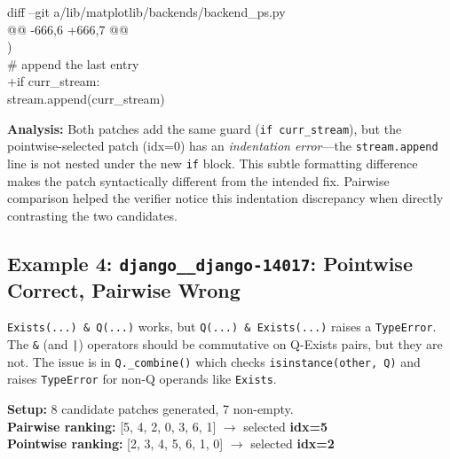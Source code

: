 \begin{tcolorbox}[
    colback=red!5,
    colframe=red!60!black,
    title={\textbf{Pointwise-Selected Patch (idx=0): Does not resolve the issue \ding{55}}},
    coltitle=white,
    fonttitle=\small\bfseries,
    breakable,
    enhanced
]
\small\ttfamily
diff --git a/lib/matplotlib/backends/backend\_ps.py\\
@@ -666,6 +666,7 @@\\
\quad\quad\quad\quad )\\
\quad\quad\quad \# append the last entry\\
+\quad\quad\quad if curr\_stream:\\
\quad\quad\quad stream.append(curr\_stream)
\end{tcolorbox}

\noindent\textbf{Analysis:} Both patches add the same guard (\texttt{if curr\_stream}), but the pointwise-selected patch (idx=0) has an \emph{indentation error}---the \texttt{stream.append} line is not nested under the new \texttt{if} block. This subtle formatting difference makes the patch syntactically different from the intended fix. Pairwise comparison helped the verifier notice this indentation discrepancy when directly contrasting the two candidates.


\subsection{Example 4: \texttt{django\_\_django-14017}: Pointwise Correct, Pairwise Wrong}

\begin{tcolorbox}[
    colback=promptbg,
    colframe=promptborder,
    title={\textbf{Issue: Q(...) \& Exists(...) raises a TypeError}},
    coltitle=white,
    fonttitle=\small\bfseries,
    breakable,
    enhanced
]
\small
\texttt{Exists(...) \& Q(...)} works, but \texttt{Q(...) \& Exists(...)} raises a \texttt{TypeError}. The \texttt{\&} (and \texttt{|}) operators should be commutative on Q-Exists pairs, but they are not. The issue is in \texttt{Q.\_combine()} which checks \texttt{isinstance(other, Q)} and raises \texttt{TypeError} for non-Q operands like \texttt{Exists}.
\end{tcolorbox}

\noindent\textbf{Setup:} 8 candidate patches generated, 7 non-empty.\\
\textbf{Pairwise ranking:} [5, 4, 2, 0, 3, 6, 1] \quad $\rightarrow$ selected \textbf{idx=5} \\
\textbf{Pointwise ranking:} [2, 3, 4, 5, 6, 1, 0] \quad $\rightarrow$ selected \textbf{idx=2} \checkmark


